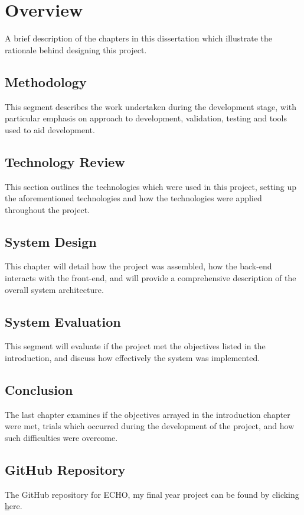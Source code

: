 \section{Overview}
A brief description of the chapters in this dissertation which illustrate the rationale behind designing this project.
\subsection{Methodology}
This segment describes the work undertaken during the development stage, with particular emphasis on approach to development, validation, testing and tools used to aid development.
\subsection{Technology Review}
This section outlines the technologies which were used in this project, setting up the aforementioned technologies and how the technologies were applied throughout the project.
\subsection{System Design}
This chapter will detail how the project was assembled, how the back-end interacts with the front-end, and will provide a comprehensive description of the overall system architecture.
\subsection{System Evaluation}
This segment will evaluate if the project met the objectives listed in the introduction, and discuss how effectively the system was implemented.
\subsection{Conclusion}
The last chapter examines if the objectives arrayed in the introduction chapter were met, trials which occurred during the development of the project, and how such difficulties were overcome.
\subsection{GitHub Repository}
The GitHub repository for ECHO, my final year project can be found by clicking \href{https://github.com/Rshocks/Final-Year-Project}here.

